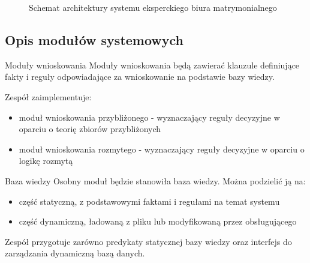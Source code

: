 \documentclass{beamer}
\begin{document}
\begin{frame}
	\begin{figure}
		\centering
		\caption{\centering Schemat architektury systemu eksperckiego biura matrymonialnego}
	\end{figure}
	
\end{frame}

\subsection{Opis modułów systemowych}

\begin{frame}

	\begin{block}{Moduły wnioskowania}
		Moduły wnioskowania będą zawierać klauzule definiujące fakty i reguły odpowiadające za wnioskowanie na podstawie bazy wiedzy. 
		
		Zespół zaimplementuje:
		\begin{itemize}
			\item moduł wnioskowania przybliżonego - wyznaczający reguły decyzyjne w oparciu o teorię zbiorów przybliżonych
			\item moduł wnioskowania rozmytego - wyznaczający reguły decyzyjne w oparciu o logikę rozmytą
		\end{itemize}
	\end{block}

\end{frame}

\begin{frame}

	\begin{block}{Baza wiedzy}
		Osobny moduł będzie stanowiła baza wiedzy. Można podzielić ją na:
		\begin{itemize}
			\item część statyczną, z podstawowymi faktami i regułami na temat systemu
			\item część dynamiczną, ładowaną z pliku lub modyfikowaną przez obsługującego
		\end{itemize}
		Zespół przygotuje zarówno predykaty statycznej bazy wiedzy oraz interfejs do zarządzania dynamiczną bazą danych.
	\end{block}

\end{frame}
\end{document}
